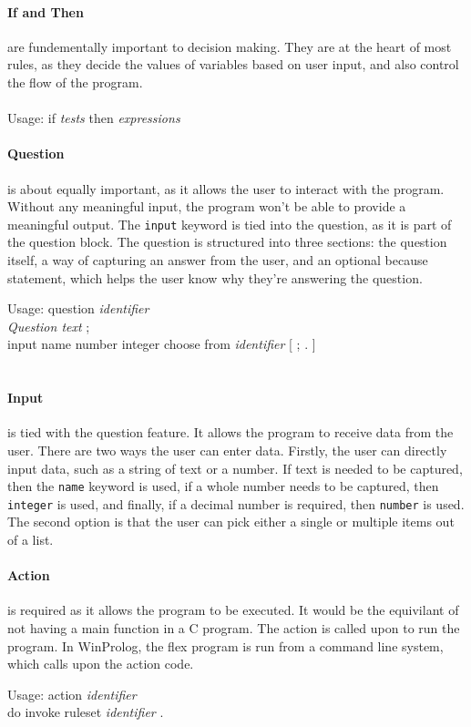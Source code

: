 \documentclass[12pt]{report}
\begin{document}
\paragraph{If and Then} are fundementally important to decision making.  They are at the heart of most rules, as they decide the values of variables based on user input, and also control the flow of the program.\\
\\
Usage: if \textit{tests} then \textit{expressions}
\paragraph{Question} is about equally important, as it allows the user to interact with the program.  Without any meaningful input, the program won't be able to provide a meaningful output.  The \texttt{input} keyword is tied into the question, as it is part of the question block.  The question is structured into three sections: the question itself, a way of capturing an answer from the user, and an optional because statement, which helps the user know why they're answering the question.\\
\begin{tabbing}
	Usage: question \= \textit{identifier}\\
	\> \textit{Question text} ; \\
	\> input name \textbar \space number \textbar \space integer \textbar \space choose from \textit{identifier} [ ; \textbar \space . ]\\
	\\
\end{tabbing}
\paragraph{Input} is tied with the question feature.  It allows the program to receive data from the user.  There are two ways the user can enter data.  Firstly, the user can directly input data, such as a string of text or a number.  If text is needed to be captured, then the \texttt{name} keyword is used, if a whole number needs to be captured, then \texttt{integer} is used, and finally, if a decimal number is required, then \texttt{number} is used. The second option is that the user can pick either a single or multiple items out of a list.
\paragraph{Action} is required as it allows the program to be executed.  It would be the equivilant of not having a main function in a C program.  The action is called upon to run the program.  In WinProlog, the flex program is run from a command line system, which calls upon the action code.\\
\begin{tabbing}
	Usage: action \= \textit{identifier}\\
	\> do invoke ruleset \textit{identifier} .\\
\end{tabbing}
\end{document}
